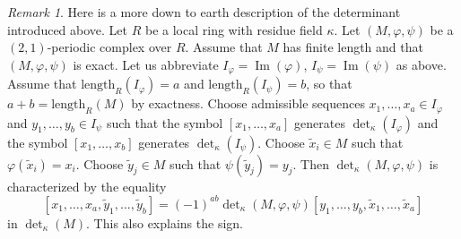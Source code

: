 \documentclass[10pt,a4paper]{amsart}
\theoremstyle{plain}
\theoremstyle{definition}
\theoremstyle{remark}
\newtheorem{remark}[subsection]{Remark}
\numberwithin{equation}{subsection}
\def\Im{\mathop{\mathrm{Im}}}
\begin{document}
\begin{remark}
\label{remark-more-elementary}
Here is a more down to earth description of the determinant
introduced above. Let $R$ be a local ring with residue field $\kappa$.
Let $(M, \varphi, \psi)$ be a $(2, 1)$-periodic complex over $R$.
Assume that $M$ has finite length and that $(M, \varphi, \psi)$ is
exact. Let us abbreviate $I_\varphi = \Im(\varphi)$,
$I_\psi = \Im(\psi)$ as above.
Assume that $\text{length}_R(I_\varphi) = a$ and
$\text{length}_R(I_\psi) = b$, so that $a + b = \text{length}_R(M)$
by exactness. Choose admissible sequences
$x_1, \ldots, x_a \in I_\varphi$ and $y_1, \ldots, y_b \in I_\psi$
such that the symbol $[x_1, \ldots, x_a]$ generates $\det_\kappa(I_\varphi)$
and the symbol $[x_1, \ldots, x_b]$ generates $\det_\kappa(I_\psi)$.
Choose $\tilde x_i \in M$ such that $\varphi(\tilde x_i) = x_i$.
Choose $\tilde y_j \in M$ such that $\psi(\tilde y_j) = y_j$.
Then $\det_\kappa(M, \varphi, \psi)$ is characterized
by the equality
$$
[x_1, \ldots, x_a, \tilde y_1, \ldots, \tilde y_b]
=
(-1)^{ab} \det\nolimits_\kappa(M, \varphi, \psi)
[y_1, \ldots, y_b, \tilde x_1, \ldots, \tilde x_a]
$$
in $\det_\kappa(M)$. This also explains the sign.
\end{remark}
\end{document}
